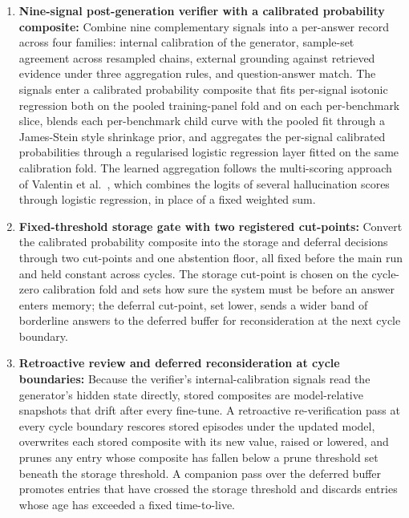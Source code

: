 \begin{enumerate}
\item \textbf{Nine-signal post-generation verifier with a calibrated probability composite:} Combine nine complementary signals into a per-answer record across four families: internal calibration of the generator, sample-set agreement across resampled chains, external grounding against retrieved evidence under three aggregation rules, and question-answer match. The signals enter a calibrated probability composite that fits per-signal isotonic regression both on the pooled training-panel fold and on each per-benchmark slice, blends each per-benchmark child curve with the pooled fit through a James-Stein style shrinkage prior, and aggregates the per-signal calibrated probabilities through a regularised logistic regression layer fitted on the same calibration fold. The learned aggregation follows the multi-scoring approach of Valentin et al.~\cite{valentin2024hallucination}, which combines the logits of several hallucination scores through logistic regression, in place of a fixed weighted sum.

\item \textbf{Fixed-threshold storage gate with two registered cut-points:} Convert the calibrated probability composite into the storage and deferral decisions through two cut-points and one abstention floor, all fixed before the main run and held constant across cycles. The storage cut-point is chosen on the cycle-zero calibration fold and sets how sure the system must be before an answer enters memory; the deferral cut-point, set lower, sends a wider band of borderline answers to the deferred buffer for reconsideration at the next cycle boundary.

\item \textbf{Retroactive review and deferred reconsideration at cycle boundaries:} Because the verifier's internal-calibration signals read the generator's hidden state directly, stored composites are model-relative snapshots that drift after every fine-tune. A retroactive re-verification pass at every cycle boundary rescores stored episodes under the updated model, overwrites each stored composite with its new value, raised or lowered, and prunes any entry whose composite has fallen below a prune threshold set beneath the storage threshold. A companion pass over the deferred buffer promotes entries that have crossed the storage threshold and discards entries whose age has exceeded a fixed time-to-live.


\end{enumerate}
